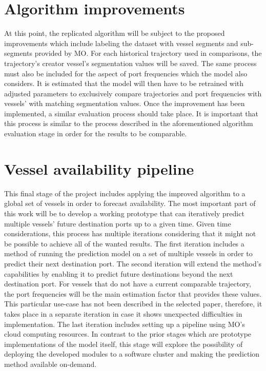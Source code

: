 \section{Algorithm improvements}

At this point, the replicated algorithm will be subject to the proposed improvements which include labeling the dataset with vessel segments and sub-segments provided by MO. For each historical trajectory used in comparisons, the trajectory’s creator vessel’s segmentation values will be saved. The same process must also be included for the aspect of port frequencies which the model also considers. It is estimated that the model will then have to be retrained with adjusted parameters to exclusively compare trajectories and port frequencies with vessels’ with matching segmentation values. Once the improvement has been implemented, a similar evaluation process should take place. It is important that this process is similar to the process described in the aforementioned algorithm evaluation stage in order for the results to be comparable.

\section{Vessel availability pipeline}

This final stage of the project includes applying the improved algorithm to a global set of vessels in order to forecast availability. The most important part of this work will be to develop a working prototype that can iteratively predict multiple vessels’ future destination ports up to a given time. Given time considerations, this process has multiple iterations considering that it might not be possible to achieve all of the wanted results. The first iteration includes a method of running the prediction model on a set of multiple vessels in order to predict their next destination port. The second iteration will extend the method’s capabilities by enabling it to predict future destinations beyond the next destination port. For vessels that do not have a current comparable trajectory, the port frequencies will be the main estimation factor that provides these values. This particular use-case has not been described in the selected paper, therefore, it takes place in a separate iteration in case it shows unexpected difficulties in implementation. The last iteration includes setting up a pipeline using MO’s cloud computing resources. In contrast to the prior stages which are prototype implementations of the model itself, this stage will explore the possibility of deploying the developed modules to a software cluster and making the prediction method available on-demand.




